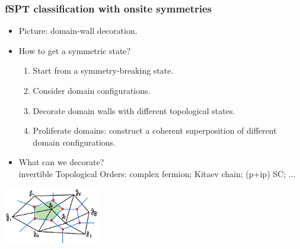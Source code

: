 \documentclass[xcolor=table, 11pt, aspectratio=169]{beamer}
\begin{document}
\begin{frame}
  \frametitle{fSPT classification with onsite symmetries}
  \begin{itemize}
    \item Picture: domain-wall decoration.
    \item How to get a symmetric state?
    \begin{enumerate}
      \item Start from a symmetry-breaking state.
      \item Consider domain configurations.
      \item \alert{Decorate domain walls with different topological states.}
      \item Proliferate domains: construct a coherent superposition of different domain configurations.
    \end{enumerate}
    \item What can we decorate?\\
    invertible Topological Orders: complex fermion; Kitaev chain; (p+ip) SC; ...
  \end{itemize}
  \begin{center}
    \includegraphics[height=2.5cm]{../chainmap/decoration.png}
  \end{center}
\end{frame}
\end{document}

